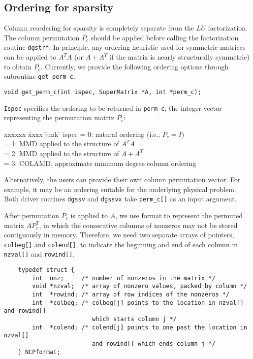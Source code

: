 \subsection{Ordering for sparsity}
\label{sec:permX}
Column reordering for sparsity is completely separate from the $LU$ 
factorization. The column permutation $P_c$ should be applied before
calling the factorization routine {\tt dgstrf}. In principle, any ordering
heuristic used for symmetric matrices can be applied to $A^TA$ 
(or $A+A^T$ if the matrix is nearly structurally symmetric) to obtain $P_c$.
Currently, we provide the following ordering options through 
subroutine {\tt get\_perm\_c}.

\vspace{.1in}
{\tt void get\_perm\_c(int ispec, SuperMatrix *A, int *perm\_c);}
\vspace{.1in}

{\tt Ispec} specifies the ordering to be returned in {\tt *perm\_c}, 
the integer vector representing the permutation matrix $P_c$:
\begin{tabbing}
xxxxxx \= xxxx \= junk \= \kill
\>ispec\> = 0: natural ordering (i.e., $P_c=I$)\\
\>     \> = 1: MMD applied to the structure of $A^TA$\\
\>     \> = 2: MMD applied to the structure of $A+A^T$\\
\>     \> = 3: COLAMD, approximate minimum degree column ordering
\end{tabbing}	    


Alternatively, the users can provide their own column permutation vector.
For example, it may be an ordering suitable for the underlying physical
problem. Both driver routines {\tt dgssv} and {\tt dgssvx} take 
{\tt perm\_c[]} as an input argument.

After permutation $P_c$ is applied to $A$, we use {\NCP} format
to represent the permuted matrix $AP_c^T$, in which the consecutive 
columns of nonzeros may not be stored contiguously in memory.
Therefore, we need two separate arrays of pointers, {\tt colbeg[]} and 
{\tt colend[]}, to indicate the beginning and end of
each column in {\tt nzval[]} and {\tt rowind[]}.
\begin{verbatim}
    typedef struct {
        int  nnz;     /* number of nonzeros in the matrix */
        void *nzval;  /* array of nonzero values, packed by column */
        int  *rowind; /* array of row indices of the nonzeros */
        int  *colbeg; /* colbeg[j] points to the location in nzval[] and rowind[]
                         which starts column j */
        int  *colend; /* colend[j] points to one past the location in nzval[]
                         and rowind[] which ends column j */
    } NCPformat;
\end{verbatim}


